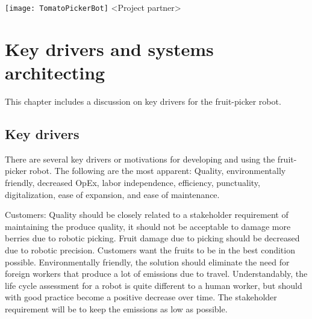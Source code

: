 \documentclass[%
oneside,    %
project,    %
nosummary   %
]{USN-MSc}
\newcommand{\myauthor}{%
223786 Lars Rikard Rådstoga
}
\newcommand{\myparticipants}{
<First participant>\\
<Second participant>\\
<Third participant>\\
<Fourth participant>
}
\begin{document}
\USNtitlepage%
{%
  {\normalsize}
   \texttt{[image: TomatoPickerBot]}}
{<Project partner>}
{%
\lipsum[6-7]
}





\tableofcontents
{}



\chapter{Key drivers and systems architecting}
\label{ch:keyDrivers}
This chapter includes a discussion on key drivers for the fruit-picker robot.
\section{Key drivers}
There are several key drivers or motivations for developing and using the fruit-picker robot. The following are the most apparent:
Quality, environmentally friendly, decreased OpEx, labor independence, efficiency, punctuality, digitalization, ease of expansion, and ease of maintenance.

Customers:
Quality should be closely related to a stakeholder requirement of maintaining the produce quality, it should not be acceptable to damage more berries due to robotic picking. Fruit damage due to picking should be decreased due to robotic precision. Customers want the fruits to be in the best condition possible.
Environmentally friendly, the solution should eliminate the need for foreign workers that produce a lot of emissions due to travel. Understandably, the life cycle assessment for a robot is quite different to a human worker, but should with good practice become a positive decrease over time. The stakeholder requirement will be to keep the emissions as low as possible.
\end{document}
